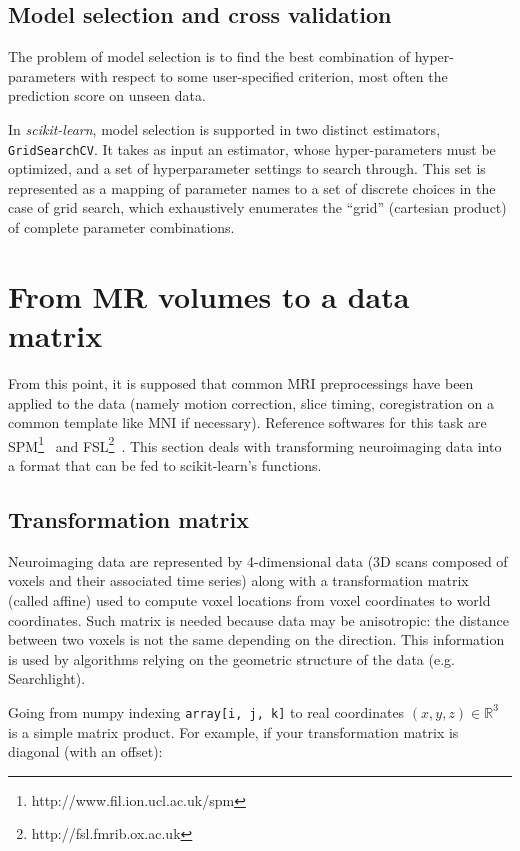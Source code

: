 \documentclass{frontiersSCNS} %
\newcounter{x}
\newcounter{y}
\newcounter{z}
\begin{document}
\subsection{Model selection and cross validation}

The problem of model selection is to find the best
combination of hyper-parameters with respect to some user-specified criterion,
most often the prediction score on unseen data.

In {\em scikit-learn}, model selection is supported in two distinct
estimators, \texttt{GridSearchCV}. It takes
as input an estimator, whose hyper-parameters must be
optimized, and a set of hyperparameter settings to search through. This set is
represented as a mapping of parameter names to a set of discrete choices in
the case of grid search, which exhaustively enumerates the ``grid'' (cartesian
product) of complete parameter combinations.

\section{From MR volumes to a data matrix}

From this point, it is supposed that common MRI preprocessings have been applied
to the data (namely motion correction, slice timing, coregistration on a common template like
MNI if necessary). Reference softwares for this task are
SPM\footnote{http://www.fil.ion.ucl.ac.uk/spm}~\citep{friston2007} and
FSL\footnote{http://fsl.fmrib.ox.ac.uk}~\citep{smith2004}.
This section deals with transforming neuroimaging data into a format that can be
fed to scikit-learn's functions.


\subsection{Transformation matrix}

Neuroimaging data are represented by 4-dimensional data (3D scans composed of
voxels and their associated time series) along with a transformation matrix
(called affine) used to compute voxel locations from voxel coordinates to
world coordinates.
Such matrix is needed because data may be anisotropic: the distance between
two voxels is not the same depending on the direction.
This information is used by algorithms relying on the geometric structure of the
data (e.g. Searchlight).

Going from
numpy indexing \verb!array[i, j, k]! to real coordinates $(x, y, z) \in
\mathbb{R}^3$ is a simple matrix product. For example, if your transformation
matrix is diagonal (with an offset):
\end{document}
